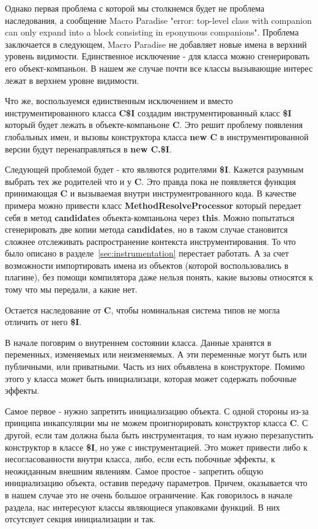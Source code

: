 Однако первая проблема с которой мы столкнемся будет не проблема наследования,
а сообщение Macro Paradise
"error: top-level class with companion can only expand into a block consisting
in eponymous companions".
Проблема заключается в следующем, Macro Paradise не добавляет новые имена в
верхний уровень видимости.
Единственное исключение - для класса можно сгенерировать его объект-компаньон.
В нашем же случае почти все классы вызывающие интерес лежат в верхнем уровне
видимости.

Что же, воспользуемся единственным исключением и вместо инструментированного
класса \textbf{C\$I} создадим инструментированный класс \textbf{\$I} который
будет лежать в объекте-компаньоне \textbf{C}.
Это решит проблему появления глобальных имен, и вызовы конструктора класса
\textbf{new C} в инструментированной версии будут перенаправляться
в \textbf{new C.\$I}.

Следующей проблемой будет - кто являются родителями \textbf{\$I}.
Кажется разумным выбрать тех же родителей что и у \textbf{C}.
Это правда пока не появляется функция принимающая \textbf{C} и вызываемая
внутри инструментрованного кода.
В качестве примера можно привести класс \textbf{MethodResolveProcessor}
который передает себя в метод \textbf{candidates} объекта-компаньона
через \textbf{this}.
Можно попытаться сгенерировать две копии метода \textbf{candidates},
но в таком случае становится сложнее отслеживать распространение контекста
инструментирования.
То что было описано в разделе~\ref{sec:instrumentation} перестает работать.
А за счет возможности импортировать имена из объектов (которой воспользовались
в плагине), без помощи компилятора даже нельзя понять, какие вызовы относятся
к тому что мы передали, а какие нет.

Остается наследование от \textbf{C}, чтобы номинальная система типов не могла
отличить от него \textbf{\$I}.

В начале поговрим о внутреннем состоянии класса.
Данные хранятся в переменных, изменяемых или неизменяемых.
А эти переменные могут быть или публичными, или приватными.
Часть из них объявлена в конструкторе.
Помимо этого у класса может быть инициализаци, которая может содержать побочные
эффекты.

Самое первое - нужно запретить инициализацию объекта.
С одной стороны из-за принципа инкапсуляции мы не можем проигнорировать
конструктор класса \textbf{C}.
С другой, если там должна была быть инструментация, то нам нужно перезапустить
конструктор в классе \textbf{\$I}, но уже с инструментацией.
Это может привести либо к несогласованности внутри класса, либо, если есть
побочные эффекты, к неожиданным внешним явлениям.
Самое простое - запретить общую инициализацию объекта, оставив передачу параметров.
Причем, оказывается что в нашем случае это не очень большое ограничение.
Как говорилось в начале раздела, нас интересуют классы являющиеся упаковками
функций.
В них отсутсвует секция инициализации и так.

